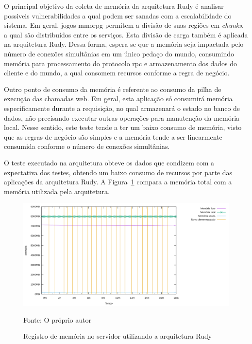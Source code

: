 O principal objetivo da coleta de memória da arquitetura Rudy é analisar possiveis vulnerabilidades a qual podem ser sanadas com a escalabilidade do sistema.
%
Em geral, jogos \ac{mmorpg} permitem a divisão de suas regiões em \textit{chunks}, a qual são distribuídos entre os serviços.
%
Esta divisão de carga também é aplicada na arquitetura Rudy.
%
Dessa forma, espera-se que a memória seja impactada pelo número de conexões simultânias em um único pedaço do mundo, consumindo memória para processamento do protocolo \ac{rpc} e armazenamento dos dados do cliente e do mundo, a qual consomem recursos conforme a regra de negócio.

Outro ponto de consumo da memória é referente ao consumo da pilha de execução das chamadas web. Em geral, esta aplicação só consumirá memória especificamente durante a requisição, no qual armazenará o estado no banco de dados, não precisando executar outras operações para manutenção da memória local.
%
Nesse sentido, este teste tende a ter um baixo consumo de memória, visto que as regras de negócio são simples e a memória tende a ser linearmente consumida conforme o número de conexões simultânias.

O teste executado na arquitetura obteve os dados que condizem com a expectativa dos testes, obtendo um baixo consumo de recursos por parte das aplicações da arquitetura Rudy.
%
A Figura~\ref{fig:rudy_t4_memory} compara a memória total com a memória utilizada pela arquitetura.

\begin{figure}[htb!]
    \caption{Registro de memória no servidor utilizando a arquitetura Rudy}
    \label{fig:rudy_t4_memory}
    \includegraphics[width=\textwidth]{metricas_rudy_t4/memory.png}
    \centering
    
    Fonte: O próprio autor
\end{figure}

